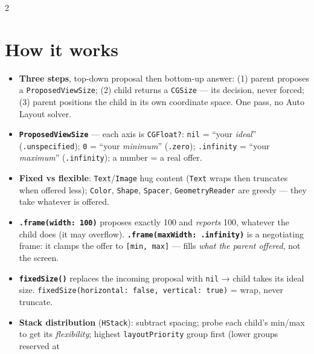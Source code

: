 \documentclass[8pt]{extarticle}
\begin{document}



\begin{multicols}{2}
\raggedright

\section{How it works}
\begin{itemize}
  \item \textbf{Three steps}, top-down proposal then bottom-up answer: (1) parent proposes a
        \texttt{ProposedViewSize}; (2) child returns a \texttt{CGSize} — its decision, never forced;
        (3) parent positions the child in its own coordinate space. One pass, no Auto Layout solver.
  \item \textbf{\texttt{ProposedViewSize}} — each axis is \texttt{CGFloat?}:
        \texttt{nil} = ``your \emph{ideal}'' (\texttt{.unspecified}); \texttt{0} = ``your \emph{minimum}''
        (\texttt{.zero}); \texttt{.infinity} = ``your \emph{maximum}'' (\texttt{.infinity}); a number = a real offer.
  \item \textbf{Fixed vs flexible}: \texttt{Text}/\texttt{Image} hug content (\texttt{Text} wraps then
        truncates when offered less); \texttt{Color}, \texttt{Shape}, \texttt{Spacer}, \texttt{GeometryReader}
        are greedy — they take whatever is offered.
  \item \textbf{\texttt{.frame(width: 100)}} proposes exactly 100 and \emph{reports} 100, whatever the child
        does (it may overflow). \textbf{\texttt{.frame(maxWidth: .infinity)}} is a negotiating frame: it clamps
        the offer to \texttt{[min, max]} — fills \emph{what the parent offered}, not the screen.
  \item \textbf{\texttt{fixedSize()}} replaces the incoming proposal with \texttt{nil} → child takes its ideal
        size. \texttt{fixedSize(horizontal: false, vertical: true)} = wrap, never truncate.
  \item \textbf{Stack distribution} (\texttt{HStack}): subtract spacing; probe each child's min/max to get
        its \emph{flexibility}; highest \texttt{layoutPriority} group first (lower groups reserved at

\end{itemize}
\end{multicols}
\end{document}
